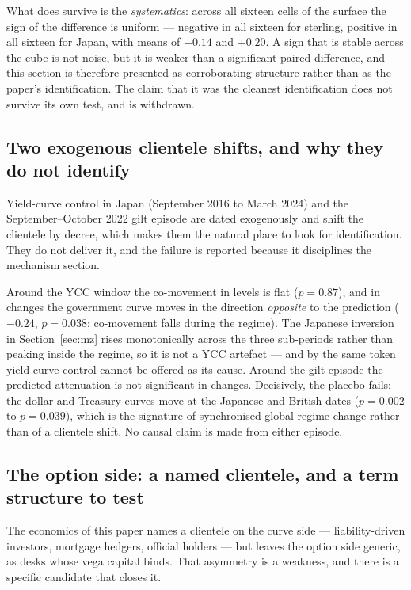 \documentclass[11pt]{article}
\begin{document}
What does survive is the \emph{systematics}: across all sixteen cells of the surface the sign of the
difference is uniform --- negative in all sixteen for sterling, positive in all sixteen for Japan,
with means of $-0.14$ and $+0.20$. A sign that is stable across the cube is not noise, but it is
weaker than a significant paired difference, and this section is therefore presented as corroborating
structure rather than as the paper's identification. The claim that it was the cleanest
identification does not survive its own test, and is withdrawn.

\subsection{Two exogenous clientele shifts, and why they do not identify}\label{sec:natexp}
Yield-curve control in Japan (September 2016 to March 2024) and the September--October 2022 gilt
episode are dated exogenously and shift the clientele by decree, which makes them the natural place
to look for identification. They do not deliver it, and the failure is reported because it disciplines
the mechanism section.

Around the YCC window the co-movement in levels is flat ($p=0.87$), and in changes the government
curve moves in the direction \emph{opposite} to the prediction ($-0.24$, $p=0.038$: co-movement falls
during the regime). The Japanese inversion in Section~\ref{sec:mz} rises monotonically across the
three sub-periods rather than peaking inside the regime, so it is not a YCC artefact --- and by the
same token yield-curve control cannot be offered as its cause. Around the gilt episode the predicted
attenuation is not significant in changes. Decisively, the placebo fails: the dollar and Treasury
curves move at the Japanese and British dates ($p=0.002$ to $p=0.039$), which is the signature of
synchronised global regime change rather than of a clientele shift. No causal claim is made from
either episode.

\subsection{The option side: a named clientele, and a term structure to test}\label{sec:optionside}
The economics of this paper names a clientele on the curve side --- liability-driven investors, mortgage
hedgers, official holders --- but leaves the option side generic, as desks whose vega capital binds.
That asymmetry is a weakness, and there is a specific candidate that closes it.
\end{document}
